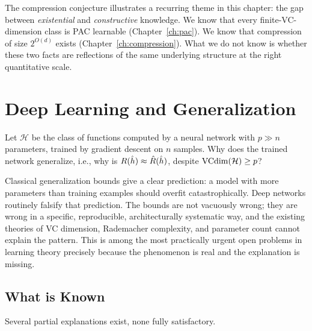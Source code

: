 \begin{remark}
The compression conjecture illustrates a recurring theme in this chapter:
the gap between \emph{existential} and \emph{constructive} knowledge.  We
know that every finite-VC-dimension class is PAC learnable (Chapter~\ref{ch:pac}).
We know that compression of size $2^{O(d)}$ exists
(Chapter~\ref{ch:compression}).  What we do not know is whether these two
facts are reflections of the same underlying structure at the right
quantitative scale.
\end{remark}



\section{Deep Learning and Generalization}
\label{sec:deep-generalization}

\begin{openprob}
\label{op:deep-gen}
Let $\mathcal{H}$ be the class of functions computed by a neural network
with $p \gg n$ parameters, trained by gradient descent on $n$ samples.
Why does the trained network generalize, i.e., why is $R(\hat{h})
\approx \hat{R}(\hat{h})$, despite $\mathrm{VCdim}(\mathcal{H}) \geq p$?
\end{openprob}

Classical generalization bounds give a clear prediction: a model with more parameters than training examples should overfit catastrophically.  Deep networks routinely falsify that prediction.  The bounds are not vacuously wrong; they are wrong in a specific, reproducible, architecturally systematic way, and the existing theories of VC dimension, Rademacher complexity, and parameter count cannot explain the pattern.  This is among the most practically urgent open problems in learning theory precisely because the phenomenon is real and the explanation is missing.

\subsection{What is Known}

Several partial explanations exist, none fully satisfactory.

